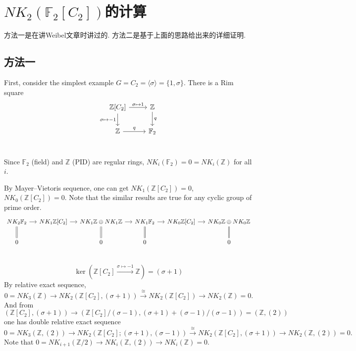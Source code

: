 \section{$NK_2(\mathbb{F}_2[C_2])$的计算}
方法一是在讲Weibel文章\cite{weibel2009nk0}时讲过的. 方法二是基于上面的思路给出来的详细证明. 
{\normalsize \color{gray}\subsection{方法一}
\label{sec:C2Cp}
First, consider the simplest example $G=C_2=\langle \sigma \rangle=\{1, \sigma\}$. There is a Rim square
\begin{equation}
\label{rimsqC2}
	\begin{tikzcd}
		\mathbb{Z}[C_2] \ar[r, "\sigma\mapsto 1"] \ar[d, "\sigma\mapsto -1"']& \mathbb{Z}\ar[d, "q"]\\
		 \mathbb{Z}\ar[r, "q"] & \mathbb{F}_2\\
	\end{tikzcd}
\end{equation}
	
Since $\mathbb{F}_2$ (field) and $\mathbb{Z}$ (PID) are regular rings, $NK_i(\mathbb{F}_2)=0=NK_i(\mathbb{Z})$ for all $i$. 

By Mayer–Vietoris sequence, one can get $NK_1(\mathbb{Z}[C_2])=0$, $NK_0(\mathbb{Z}[C_2])=0$. Note that the similar results are true for any cyclic group of prime order. 
	\[\begin{tikzcd}[column sep=small]
		NK_2 \mathbb{F}_2 \ar[r] \ar[d, equal]& NK_1 \mathbb{Z}[C_2] \ar[r] & NK_1 \mathbb{Z} \oplus NK_1 \mathbb{Z} \ar[r] \ar[d, equal]& NK_1 \mathbb{F}_2 \ar[r] \ar[d, equal] & NK_0 \mathbb{Z}[C_2] \ar[r]&NK_0 \mathbb{Z} \oplus NK_0 \mathbb{Z}  \ar[d, equal] \\
		0 & & 0 &0 & & 0\\
	\end{tikzcd}\]

\[\ker(\mathbb{Z}[C_2]\overset{\sigma \mapsto -1}\longrightarrow \mathbb{Z}) =(\sigma +1)\]
By relative exact sequence, 
\[0=NK_3(\mathbb{Z})\longrightarrow NK_2(\mathbb{Z}[C_2], (\sigma+1))\overset{\cong}\longrightarrow NK_2(\mathbb{Z}[C_2])\longrightarrow NK_2(\mathbb{Z})=0. \]
And from $(\mathbb{Z}[C_2], (\sigma+1))\longrightarrow (\mathbb{Z}[C_2]/(\sigma-1), (\sigma+1)+(\sigma-1)/(\sigma-1))=(\mathbb{Z}, (2))$ one has double relative exact sequence
\[0=NK_3(\mathbb{Z}, (2))\longrightarrow NK_2(\mathbb{Z}[C_2];(\sigma+1), (\sigma-1))\overset{\cong}\longrightarrow NK_2(\mathbb{Z}[C_2], (\sigma+1))\longrightarrow NK_2(\mathbb{Z}, (2))=0. \]
Note that $0=NK_{i+1}(\mathbb{Z}/2)\longrightarrow NK_i(\mathbb{Z}, (2))\longrightarrow NK_i(\mathbb{Z})=0$. 

}

